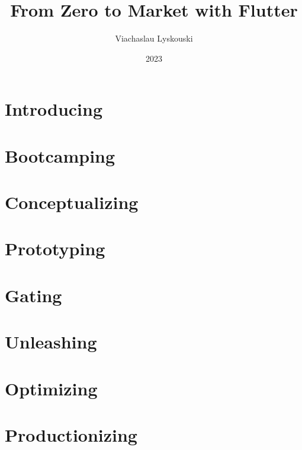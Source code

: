 \documentclass[12pt, a4paper, twoside]{extreport}
\author{Viachaslau Lyskouski}
\title{From Zero to Market with Flutter}
\date{2023}
\begin{document}

\maketitle



\tableofcontents

\newpage
\section*{Introducing}


\newpage
\section{Bootcamping}



\newpage
\section{Conceptualizing}


\newpage
\section{Prototyping}


\newpage
\section{Gating}


\newpage
\section{Unleashing}


\newpage
\section{Optimizing}


\newpage
\section{Productionizing}

\end{document}
